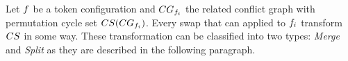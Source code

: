 \documentclass[msc,english,table,xcdraw]{ppgccufmg}
\begin{document}

Let $f$ be a token configuration and $CG_{
f_{i}}$ the related conflict graph with permutation cycle set 
$CS(CG_{f_{i}})$.
Every swap that can applied to $f_{i}$ transform $CS$ in some way.
These transformation can be classified into two types: \textit{Merge} and 
\textit{Split} as
they are described in the following paragraph.

\end{document}
